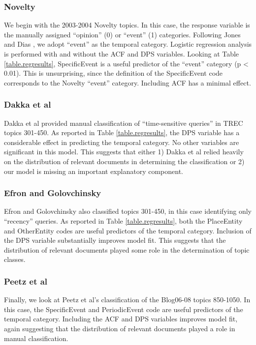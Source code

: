 \documentclass{sig-alternate}
\begin{document}
\subsubsection{Novelty}

We begin with the 2003-2004 Novelty topics. In this case, the response variable is the manually assigned ``opinion'' (0) or ``event'' (1) categories. Following Jones and Dias \cite{Jones2007}, we adopt ``event'' as the temporal category. Logistic regression analysis is performed with and without the ACF and DPS variables. Looking at Table \ref{table.regresults}, SpecificEvent is a useful predictor of the ``event'' category (p < 0.01). This is unsurprising, since the definition of the SpecificEvent code corresponds to the Novelty ``event'' category. Including ACF has a minimal effect. 

\subsubsection{Dakka et al}

Dakka et al provided manual classification of ``time-sensitive queries'' in TREC topics 301-450. As reported in Table \ref{table.regresults}, the DPS variable has a considerable effect in predicting the temporal category. No other variables are significant in this model. This suggests that either 1) Dakka et al relied heavily on the distribution of relevant documents in determining the classification or 2) our model is missing an important explanatory component.

\subsubsection{Efron and Golovchinsky}

Efron and Golovchinsky also classified topics 301-450, in this case identifying only ``recency'' queries. As reported in Table \ref{table.regresults}, both the PlaceEntity and OtherEntity codes are useful predictors of the temporal category. Inclusion of the DPS variable substantially improves model fit. This suggests that the distribution of relevant documents played some role in the determination of topic classes.

\subsubsection{Peetz et al}
Finally, we look at Peetz et al's classification of the Blog06-08 topics 850-1050. In this case, the SpecificEvent and PeriodicEvent code are useful predictors of the temporal category. Including the ACF and DPS variables improves model fit, again suggesting that the distribution of relevant documents played a role in manual classification.
\end{document}
